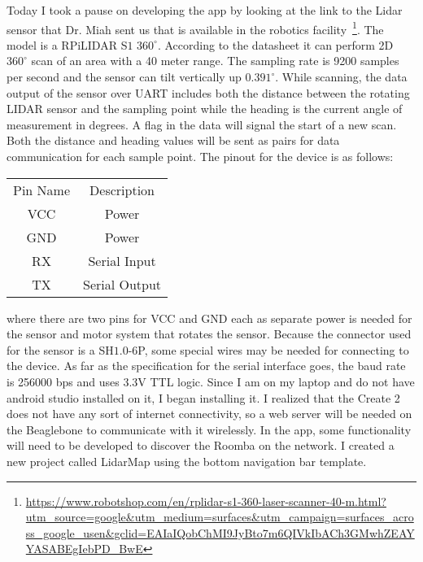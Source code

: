 \documentclass[fontsize=11pt, %
                             paper=a4, %
                             twoside, %
                             captions=tableheading,
                             index=totoc,
                             hyperref]{labbook}
\begin{document}
\begin{addmargin}[0cm]{0cm}
Today I took a pause on developing the app by looking at the link to the Lidar sensor that Dr. Miah sent us that is available in the robotics facility~\footnote{\url{https://www.robotshop.com/en/rplidar-s1-360-laser-scanner-40-m.html?utm_source=google&utm_medium=surfaces&utm_campaign=surfaces_across_google_usen&gclid=EAIaIQobChMI9JyBto7m6QIVkIbACh3GMwhZEAYYASABEgIebPD_BwE}}. 
The model is a RPiLIDAR S$1$ $360^\circ$. According to the datasheet it can perform 2D $360^\circ$ scan of an area with a 40 meter range. The sampling rate is 9200 samples per second and the sensor can tilt vertically up $0.391^\circ$. While scanning, the data output of the sensor over UART includes both the distance between the rotating LIDAR sensor and the sampling point while the heading is the current angle of measurement in degrees. A flag in the data will signal the start of a new scan. Both the distance and heading values will be sent as pairs for data communication for each sample point. The pinout for the device is as follows:

\begin{center}
\begin{tabular}{|c|c|}
\hline
Pin Name & Description \\
VCC & Power\\
GND & Power\\
RX & Serial Input\\
TX & Serial Output\\
\hline
\end{tabular}
\end{center}
where there are two pins for VCC and GND each as separate power is needed for the sensor and motor system that rotates the sensor. Because the connector used for the sensor is a SH$1.0$-$6$P, some special wires may be needed for connecting to the device. As far as the specification for the serial interface goes, the baud rate is 256000 bps and uses 3.3V TTL logic.
\smallbreak\noindent
Since I am on my laptop and do not have android studio installed on it, I began installing it. I realized that the Create 2 does not have any sort of internet connectivity, so a web server will be needed on the Beaglebone to communicate with it wirelessly. In the app, some functionality will need to be developed to discover the Roomba on the network. 
\smallbreak\noindent
I created a new project called LidarMap using the bottom navigation bar template.


\end{addmargin}
\end{document}
